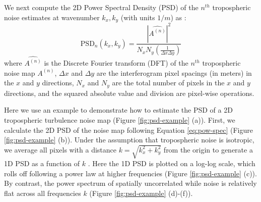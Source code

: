 \documentclass{utexasthesis}
\begin{document}
We next compute the 2D Power Spectral Density (PSD) of the $n^{th}$ tropospheric noise estimates at  wavenumber $ k_x, k_y $ (with units $1/m$) as \citep{Jacobs2017QuantitativeCharacterizationSurface}:
\begin{equation}
\text{PSD}_n(k_x, k_y) = \frac{| \widehat{A^{(n)}} |^2 }{N_x N_y (\frac{1}{\Delta x \Delta y}) } \label{eq:pow-spec}
\end{equation}
where  $\widehat{A^{(n)}}$ is the Discrete Fourier transform (DFT) of  the $n^{th}$ tropospheric noise map $A^{(n)}$, $\Delta x$ and $\Delta y$ are the interferogram pixel spacings (in meters) in the $x$ and $y$ directions, $N_x$ and $N_y$ are the total number of pixels in the $x$ and $y$ directions, and the squared absolute value and division are pixel-wise operations. 



Here we use an example to demonstrate how to estimate the PSD of a 2D tropospheric turbulence noise map (Figure \ref{fig:psd-example} (a)). First, we calculate the 2D PSD of the noise map following Equation \eqref{eq:pow-spec} (Figure \ref{fig:psd-example} (b)). Under the assumption that tropospheric noise is isotropic, we average all pixels with a distance  $k= \sqrt{k_x^2 + k_y^2}$ from the origin to generate a 1D PSD as a function of $k$ \citep{Hanssen2001RadarInterferometryData}.
Here the 1D PSD is plotted on a log-log scale, which rolls off following a power law at higher frequencies (Figure \ref{fig:psd-example} (c)). By contrast, the power spectrum of spatially uncorrelated while noise is relatively flat across all frequencies $k$ (Figure \ref{fig:psd-example} (d)-(f)).
\end{document}
